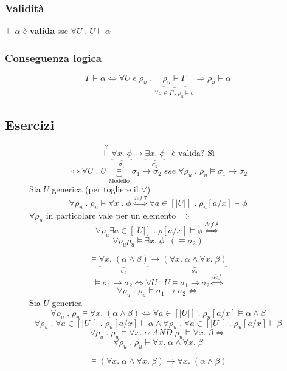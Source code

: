 \documentclass{article}
\theoremstyle{break}
\theoremstyle{break}
\theoremstyle{break}
\theoremstyle{break}
\begin{document}
\subsubsection{Validità}
\( \models \alpha \) è \textbf{valida} sse \( \forall U \; . \; U \models \alpha \) 

\subsubsection{Conseguenza logica}
\[
  \Gamma \models \alpha \Leftrightarrow \forall U \; e \; \rho_u \; . \; \underbrace{\rho_u \models \Gamma}_{\forall \sigma \in \Gamma \; . \; \rho_u \models \sigma} \Rightarrow \rho_u \models \alpha
\] 

\subsection{Esercizi}
\begin{figure}[H]
  \begin{exercise}
    \[
      \stackrel{?}{\models} \underbrace{\forall x.\; \phi}_{\sigma_1} \to \underbrace{\exists x.\; \phi}_{\sigma_2} \;\;\; \text{è valida? Sì}
    \] 
    \[
      \Leftrightarrow \forall U\;.\; U \underbrace{\models}_{\text{Modello}} \sigma_1 \to \sigma_2 \;sse\; \forall \rho_u \;.\; \rho_u \models \sigma_1 \to \sigma_2
    \] 
    Sia \( U \) generica (per togliere il \( \forall  \))
    \[
      \forall \rho_u\;.\; \rho_u \models \forall x\;.\;\phi \stackrel{def\;7}{\Leftrightarrow} \forall a \in [|U|] \;.\; \rho_u[a/x] \models \phi
    \] 
    \( \forall \rho_u \) in particolare vale per un elemento \( \Rightarrow \) \[\forall \rho_u \exists a \in [|U|]\;.\;\rho[a/x] \models \phi \stackrel{def\;8}{\Leftrightarrow}\] 
    \[
    \forall \rho_u \rho_u \models \exists x.\; \phi\;\;(\equiv \sigma_2)
    \] 
  \end{exercise}
\end{figure}
\begin{figure}[H]
  \begin{exercise}
    \[
      \models \underbrace{\forall x. \; (\alpha \wedge \beta)}_{\sigma_2} \to \underbrace{(\forall x.\;\alpha \wedge \forall x.\; \beta)}_{\sigma_2}
    \] 
    \[
      \models \sigma_1 \to \sigma_2 \Leftrightarrow \forall U \;.\; U \models \sigma_1 \to \sigma_2 \stackrel{def}{\Leftrightarrow}
    \] 
    \[
    \forall \rho_u \;.\; \rho_u \models \sigma_1 \to \sigma_2 \Leftrightarrow
    \] 
    Sia \( U \) generica
    \[
      \forall \rho_u\;.\; \rho_u \models \forall x.\; (\alpha \wedge \beta) \Leftrightarrow \forall a \in [|U|]\;.\; \rho_u[a/x] \models \alpha \wedge \beta
    \] 
    \[
      \forall \rho_u \;.\; \forall a \in [|U|]\;.\; \rho_u[a/x] \models \alpha \wedge \forall \rho_u \;.\; \forall a \in [|U|]\;.\; \rho_u[a/x] \models \beta
    \] 
    \[
    \forall \rho_u\;.\; \rho_u \models \forall x.\;\alpha \;AND\;\rho_u \models \forall x.\; \beta \Leftrightarrow
    \] 
    \[
    \forall \rho_u\;.\; \rho_u \models \forall x.\;\alpha \wedge \forall x.\; \beta
    \] 
  \end{exercise}
\end{figure}
\begin{figure}[H]
  \begin{exercise}[a casa]
    \[
    \models (\forall x.\;\alpha \wedge \forall x.\; \beta) \to \forall x. \; (\alpha \wedge \beta)
  \] 
  \end{exercise}
\end{figure}
\end{document}
